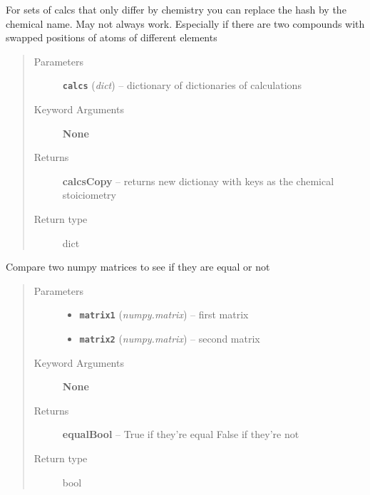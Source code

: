 \documentclass[letterpaper,10pt,english]{sphinxmanual}
\begin{document}

\begin{fulllineitems}
\label{retr:retr.chemAsKeys}
For sets of calcs that only differ by chemistry you can replace the
hash by the chemical name. May not always work. Especially if there
are two compounds with swapped positions of atoms of different elements
\begin{quote}\begin{description}
\item[{Parameters}] \leavevmode
\textbf{\texttt{calcs}} (\emph{dict}) -- dictionary of dictionaries of calculations

\item[{Keyword Arguments}] \leavevmode
\textbf{None}

\item[{Returns}] \leavevmode
\textbf{calcsCopy} --
returns new dictionay with keys as the chemical stoiciometry

\item[{Return type}] \leavevmode
dict

\end{description}\end{quote}

\end{fulllineitems}


\begin{fulllineitems}
\label{retr:retr.compMatrices}
Compare two numpy matrices to see if they are equal or not
\begin{quote}\begin{description}
\item[{Parameters}] \leavevmode\begin{itemize}
\item {} 
\textbf{\texttt{matrix1}} (\emph{numpy.matrix}) -- first matrix

\item {} 
\textbf{\texttt{matrix2}} (\emph{numpy.matrix}) -- second matrix

\end{itemize}

\item[{Keyword Arguments}] \leavevmode
\textbf{None}

\item[{Returns}] \leavevmode
\textbf{equalBool} --
True if they're equal False if they're not

\item[{Return type}] \leavevmode
bool

\end{description}\end{quote}

\end{fulllineitems}
\end{document}
